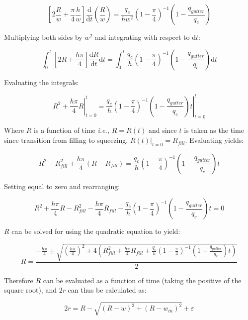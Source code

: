 \begin{equation}
  \left[2\frac{R}{w} + \frac{\pi}{4}\frac{h}{w}\right]
  \frac{\mathrm{d}}{\mathrm{d}t}\left(\frac{R}{w}\right) = 
  \frac{q_c}{hw^2} \left(1-\frac{\pi}{4}\right)^{-1}
  \left(1-\frac{q_{gutter}}{q_c}\right)
\end{equation}

\noindent Multiplying both sides by $w^2$ and integrating with respect to $\mathrm{d}t$:

$$
  \int_{0}^t{\left[2R + \frac{h\pi}{4}\right]
  \frac{\mathrm{d}R}{\mathrm{d}t}} \mathrm{d}t = 
  \int_{0}^t{\frac{q_c}{h} \left(1-\frac{\pi}{4}\right)^{-1}
  \left(1-\frac{q_{gutter}}{q_c}\right)} \mathrm{d}t
$$

\noindent Evaluating the integrals:

$$ 
  \left. R^2 + \frac{h\pi}{4}R \right|_{t=0}^{t}=
  \left. \frac{q_c}{h}
  \left(1-\frac{\pi}{4}\right)^{-1}
  \left(1-\frac{q_{gutter}}{q_c}\right)t \right|_{t=0}^{t}
$$

\noindent Where $R$ is a function of time \emph{i.e.,} $R=R\left(t\right)$ and since
$t$ is taken as the time since transition from filling to squeezing,
$\left. R\left(t\right)\right|_{t=0} = R_{fill}$. Evaluating yields:

$$
  R^2 - R_{fill}^2 + \frac{h\pi}{4}\left(R-R_{fill}\right) = 
  \frac{q_c}{h}
  \left(1-\frac{\pi}{4}\right)^{-1}
  \left(1-\frac{q_{gutter}}{q_c}\right)t
$$

\noindent Setting equal to zero and rearranging:

$$
  R^2 + \frac{h\pi}{4}R -
  R_{fill}^2 - \frac{h\pi}{4}R_{fill} -
  \frac{q_c}{h}
  \left(1-\frac{\pi}{4}\right)^{-1}
  \left(1-\frac{q_{gutter}}{q_c}\right)t = 0
$$

\noindent $R$ can be solved for using the quadratic equation to yield:

\begin{equation}
  R = \frac{-\frac{h\pi}{4} \pm 
  \sqrt{\left(\frac{h\pi}{4}\right)^2 +
  4\left(R_{fill}^2 + \frac{h\pi}{4}R_{fill} +
  \frac{q_c}{h}
  \left(1-\frac{\pi}{4}\right)^{-1}
  \left(1-\frac{q_{gutter}}{q_c}\right)t\right)}}{2}
\end{equation}

\noindent Therefore $R$ can be evaluated as a function of time (taking the positive of the square root), and
$2r$ can thus be calculated as:

\begin{equation}
  2r = R - \sqrt{\left(R - w\right)^2 + \left(R - w_{in}\right)^2} + \varepsilon
\end{equation}

